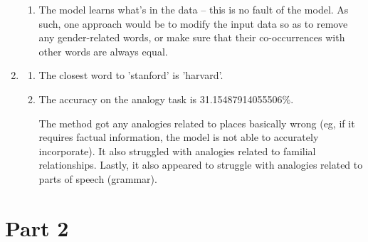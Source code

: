 \documentclass[12pt]{article}
\begin{document}
\begin{enumerate}[label=(\alph*)]
\begin{enumerate}[label=\roman*]
      \item
        The model learns what's in the data -- this is no fault of the model. As such, one approach would be to modify the input data so as to remove any gender-related words, or make sure that their co-occurrences with other words are always equal.
    \end{enumerate}

    \item
      \begin{enumerate}[label=\roman*]
        \item The closest word to 'stanford' is 'harvard'.
        \item The accuracy on the analogy task is 31.15487914055506\%.

          The method got any analogies related to places basically wrong (eg, if it requires factual information, the model is not able to accurately incorporate). It also struggled with analogies related to familial relationships. Lastly, it also appeared to struggle with analogies related to parts of speech (grammar).
      \end{enumerate}
\end{enumerate}

\newpage
\section*{Part 2}
\end{document}
